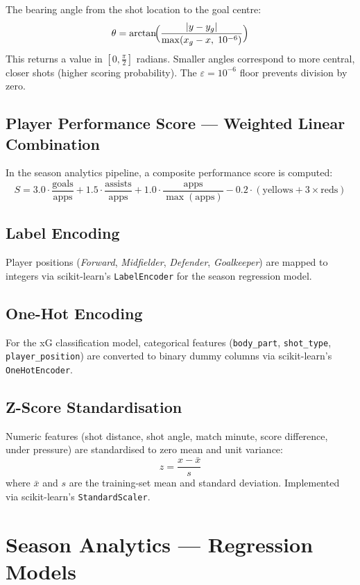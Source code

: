 \documentclass[11pt,a4paper]{article}
\begin{document}
The bearing angle from the shot location to the goal centre:
\[
  \theta = \arctan\!\Bigl(\frac{|y - y_g|}{\max(x_g - x,\;10^{-6})}\Bigr)
\]
This returns a value in $[0, \frac{\pi}{2}]$ radians.  Smaller angles
correspond to more central, closer shots (higher scoring probability).
The $\varepsilon = 10^{-6}$ floor prevents division by zero.

\subsection{Player Performance Score --- Weighted Linear Combination}

In the season analytics pipeline, a composite performance score is computed:
\[
  S = 3.0 \cdot \frac{\text{goals}}{\text{apps}}
    + 1.5 \cdot \frac{\text{assists}}{\text{apps}}
    + 1.0 \cdot \frac{\text{apps}}{\max(\text{apps})}
    - 0.2 \cdot (\text{yellows} + 3 \times \text{reds})
\]

\subsection{Label Encoding}

Player positions (\textit{Forward}, \textit{Midfielder}, \textit{Defender},
\textit{Goalkeeper}) are mapped to integers via scikit-learn's
\texttt{LabelEncoder} for the season regression model.

\subsection{One-Hot Encoding}

For the xG classification model, categorical features (\texttt{body\_part},
\texttt{shot\_type}, \texttt{player\_position}) are converted to binary
dummy columns via scikit-learn's \texttt{OneHotEncoder}.

\subsection{Z-Score Standardisation}

Numeric features (shot distance, shot angle, match minute, score
difference, under pressure) are standardised to zero mean and unit
variance:
\[
  z = \frac{x - \bar{x}}{s}
\]
where $\bar{x}$ and $s$ are the training-set mean and standard deviation.
Implemented via scikit-learn's \texttt{StandardScaler}.


\section{Season Analytics --- Regression Models}
\end{document}

